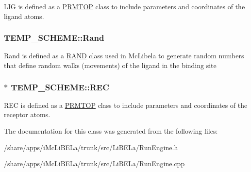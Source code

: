 \label{classTEMP__SCHEME_a71d6c0e26c014ff21a9e968c0f7fd38b}
LIG is defined as a \hyperlink{classPRMTOP}{PRMTOP} class to include parameters and coordinates of the ligand atoms. \hypertarget{classTEMP__SCHEME_a105514d3f5fa30ee5c1dfef5e09eff30}{
\subsubsection[{Rand}]{ {\bf TEMP\_\-SCHEME::Rand}}}
\label{classTEMP__SCHEME_a105514d3f5fa30ee5c1dfef5e09eff30}
Rand is defined as a \hyperlink{classRAND}{RAND} class used in McLibela to generate random numbers that define random walks (movements) of the ligand in the binding site \hypertarget{classTEMP__SCHEME_a558d4ee13995943c27dcd213ba5deaa8}{
\subsubsection[{REC}]{$\ast$ {\bf TEMP\_\-SCHEME::REC}}}
\label{classTEMP__SCHEME_a558d4ee13995943c27dcd213ba5deaa8}
REC is defined as a \hyperlink{classPRMTOP}{PRMTOP} class to include parameters and coordinates of the receptor atoms. 

The documentation for this class was generated from the following files:\begin{DoxyCompactItemize}
\item 
/share/apps/iMcLiBELa/trunk/src/LiBELa/RunEngine.h\item 
/share/apps/iMcLiBELa/trunk/src/LiBELa/RunEngine.cpp\end{DoxyCompactItemize}
